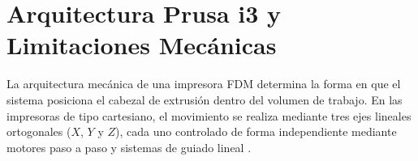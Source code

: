 \section{Arquitectura Prusa i3 y Limitaciones Mecánicas}
La arquitectura mecánica de una impresora FDM determina la forma en que el sistema posiciona el cabezal de extrusión dentro del volumen de trabajo. En las impresoras de tipo cartesiano, el movimiento se realiza mediante tres ejes lineales ortogonales ($X$, $Y$ y $Z$), cada uno controlado de forma independiente mediante motores paso a paso y sistemas de guiado lineal \cite{groover2015}.

